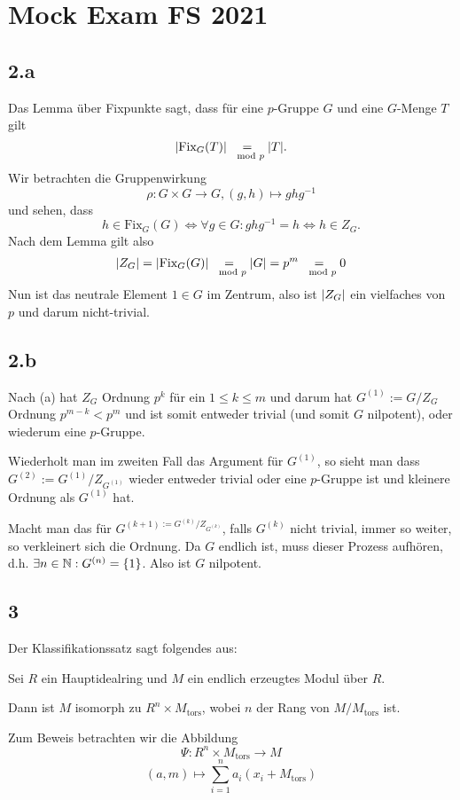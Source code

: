 
\section*{Mock Exam FS 2021}


\subsection*{2.a}
Das Lemma über Fixpunkte sagt, dass für eine $p$-Gruppe $G$ und eine $G$-Menge $T$ gilt
$$
\vert\text{Fix}_G(T)\vert \underset{\mod p}{=} \vert T\vert.
$$
Wir betrachten die Gruppenwirkung 
$$
\rho: G \times G \to G, (g,h) \mapsto ghg^{-1}
$$
und sehen, dass 
$$
h \in \text{Fix}_G(G) \iff \forall g \in G: ghg^{-1} = h \iff h \in Z_G.
$$
Nach dem Lemma gilt also
$$
\vert Z_G\vert =
\vert\text{Fix}_G(G)\vert 
\underset{\mod p}{=} \vert G\vert = p^{m} \underset{\mod p}{=} 0
$$
Nun ist das neutrale Element $1 \in G$ im Zentrum, also ist $\vert Z_G\vert$ ein vielfaches von $p$ und darum nicht-trivial.

\subsection*{2.b}
Nach (a) hat $Z_G$ Ordnung $p^k$ für ein $1 \leq k \leq m$ und darum hat
$G^{(1)} := G/Z_G$ Ordnung $p^{m-k} < p^{m}$ und ist somit entweder trivial (und somit $G$ nilpotent), oder wiederum eine $p$-Gruppe.

Wiederholt man im zweiten Fall das Argument für $G^{(1)}$, so sieht man dass $G^{(2)} := G^{(1)}/Z_{G^{(1)}}$ wieder entweder trivial oder eine $p$-Gruppe ist und kleinere Ordnung als $G^{(1)}$ hat.

Macht man das für $G^{(k+1) := G^{(k)}/Z_{G^{(k)}}}$, falls $G^{(k)}$ nicht trivial, immer so weiter, so verkleinert sich die Ordnung.
  Da $G$ endlich ist, muss dieser Prozess aufhören, d.h. $\exists n \in \mathbb{N}: G^{(n)} = \{1\}$.
  Also ist $G$ nilpotent.


\subsection*{3}
  
Der Klassifikationssatz sagt folgendes aus:

Sei $R$ ein Hauptidealring und $M$ ein endlich erzeugtes Modul über $R$. 

Dann ist $M$ isomorph zu $R^n \times M_{\text{tors}}$, wobei $n$ der Rang von $M/M_{\text{tors}}$ ist.

Zum Beweis betrachten wir die Abbildung
$$
\Psi: R^{n} \times M_{\text{tors}} \to M
$$
$$
(a,m) \mapsto \sum_{i=1}^{n}a_i (x_i + M_{\text{tors}})
$$



